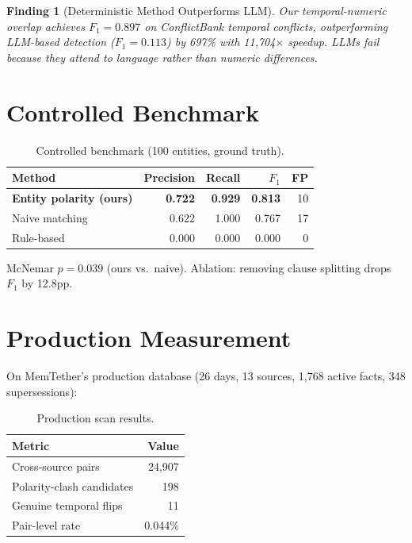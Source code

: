 \documentclass{article}
\newtheorem{finding}{Finding}
\begin{document}
\begin{finding}[Deterministic Method Outperforms LLM]
Our temporal-numeric overlap achieves $F_1 = 0.897$ on ConflictBank temporal conflicts, outperforming LLM-based detection ($F_1 = 0.113$) by 697\% with 11{,}704$\times$ speedup. LLMs fail because they attend to language rather than numeric differences.
\end{finding}

\section{Controlled Benchmark}

\begin{table}[h]
\centering
\caption{Controlled benchmark (100 entities, ground truth).}
\begin{tabular}{lrrrr}
\toprule
Method & Precision & Recall & $F_1$ & FP \\
\midrule
\textbf{Entity polarity (ours)} & \textbf{0.722} & \textbf{0.929} & \textbf{0.813} & 10 \\
Naive matching & 0.622 & 1.000 & 0.767 & 17 \\
Rule-based & 0.000 & 0.000 & 0.000 & 0 \\
\bottomrule
\end{tabular}
\label{tab:bench}
\end{table}

McNemar $p = 0.039$ (ours vs.\ naive). Ablation: removing clause splitting drops $F_1$ by 12.8pp.

\section{Production Measurement}
\label{sec:production}

On MemTether's production database (26 days, 13 sources, 1{,}768 active facts, 348 supersessions):

\begin{table}[h]
\centering
\caption{Production scan results.}
\begin{tabular}{lr}
\toprule
Metric & Value \\
\midrule
Cross-source pairs & 24{,}907 \\
Polarity-clash candidates & 198 \\
Genuine temporal flips & 11 \\
Pair-level rate & 0.044\% \\
\bottomrule
\end{tabular}
\label{tab:prod}
\end{table}
\end{document}
